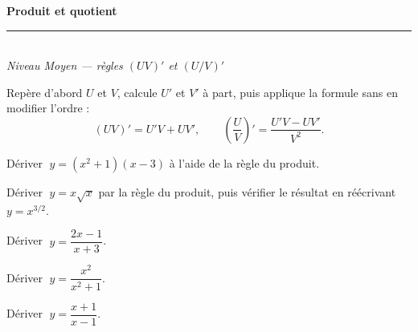 \pagestyle{fancy}\fancyhf{}
\fancyfoot[C]{\small\thepage}
\renewcommand{\headrulewidth}{0.8pt}



\begin{center}
{\LARGE\bfseries\color{primarydark} Produit et quotient}\\[2pt]
{\color{primary}\rule{0.5\textwidth}{1.2pt}}\\[4pt]
{\small\itshape Niveau Moyen --- règles $(UV)'$ et $(U/V)'$}
\end{center}
\vspace{2mm}

\begin{methode}
Repère d'abord $U$ et $V$, calcule $U'$ et $V'$ à part, puis applique la formule sans en modifier l'ordre :
\[
(UV)'=U'V+UV',\qquad \left(\frac{U}{V}\right)'=\frac{U'V-UV'}{V^{2}}.
\]
\end{methode}

\begin{exo}
Dériver $\;y=(x^{2}+1)(x-3)$ à l'aide de la règle du produit.
\end{exo}

\begin{exo}
Dériver $\;y=x\sqrt{x}$ par la règle du produit, puis vérifier le résultat en réécrivant $y=x^{3/2}$.
\end{exo}

\begin{exo}
Dériver $\;y=\dfrac{2x-1}{x+3}$.
\end{exo}

\begin{exo}
Dériver $\;y=\dfrac{x^{2}}{x^{2}+1}$.
\end{exo}

\begin{exo}
Dériver $\;y=\dfrac{x+1}{x-1}$.
\end{exo}



